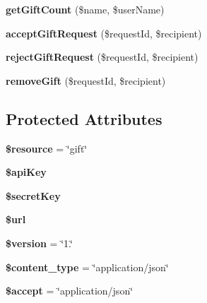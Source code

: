 \begin{DoxyCompactItemize}
\item 
\hypertarget{class_gift_service_af284c78a516e12ef90439d2b8e737e28}{{\bfseries get\+Gift\+Count} (\$name, \$user\+Name)}\label{class_gift_service_af284c78a516e12ef90439d2b8e737e28}

\item 
\hypertarget{class_gift_service_a6898187a2d1ab2408de0d8f6d29c6e6c}{{\bfseries accept\+Gift\+Request} (\$request\+Id, \$recipient)}\label{class_gift_service_a6898187a2d1ab2408de0d8f6d29c6e6c}

\item 
\hypertarget{class_gift_service_a0c38a5fe212d701992db2b7be3177036}{{\bfseries reject\+Gift\+Request} (\$request\+Id, \$recipient)}\label{class_gift_service_a0c38a5fe212d701992db2b7be3177036}

\item 
\hypertarget{class_gift_service_a1d8fddc722210d0f602af545c085909c}{{\bfseries remove\+Gift} (\$request\+Id, \$recipient)}\label{class_gift_service_a1d8fddc722210d0f602af545c085909c}

\end{DoxyCompactItemize}
\subsection*{Protected Attributes}
\begin{DoxyCompactItemize}
\item 
\hypertarget{class_gift_service_abd4c7b8b084214b8d2533ba07fce6b83}{{\bfseries \$resource} = \char`\"{}gift\char`\"{}}\label{class_gift_service_abd4c7b8b084214b8d2533ba07fce6b83}

\item 
\hypertarget{class_gift_service_a084e3db37d1b117a3cc7212cf2eed533}{{\bfseries \$api\+Key}}\label{class_gift_service_a084e3db37d1b117a3cc7212cf2eed533}

\item 
\hypertarget{class_gift_service_a766bfb236de2f29a3680976ca22790d4}{{\bfseries \$secret\+Key}}\label{class_gift_service_a766bfb236de2f29a3680976ca22790d4}

\item 
\hypertarget{class_gift_service_acf215f34a917d014776ce684a9ee8909}{{\bfseries \$url}}\label{class_gift_service_acf215f34a917d014776ce684a9ee8909}

\item 
\hypertarget{class_gift_service_a17c8948c68aa44fa9961ae169b6a8961}{{\bfseries \$version} = \char`\"{}1.\char`\"{}}\label{class_gift_service_a17c8948c68aa44fa9961ae169b6a8961}

\item 
\hypertarget{class_gift_service_ae754d6373f275e781f47c8bc9b994b6d}{{\bfseries \$content\+\_\+type} = \char`\"{}application/json\char`\"{}}\label{class_gift_service_ae754d6373f275e781f47c8bc9b994b6d}

\item 
\hypertarget{class_gift_service_a75fc18c4ff06288ff9fdf8aba9bd1081}{{\bfseries \$accept} = \char`\"{}application/json\char`\"{}}\label{class_gift_service_a75fc18c4ff06288ff9fdf8aba9bd1081}

\end{DoxyCompactItemize}

